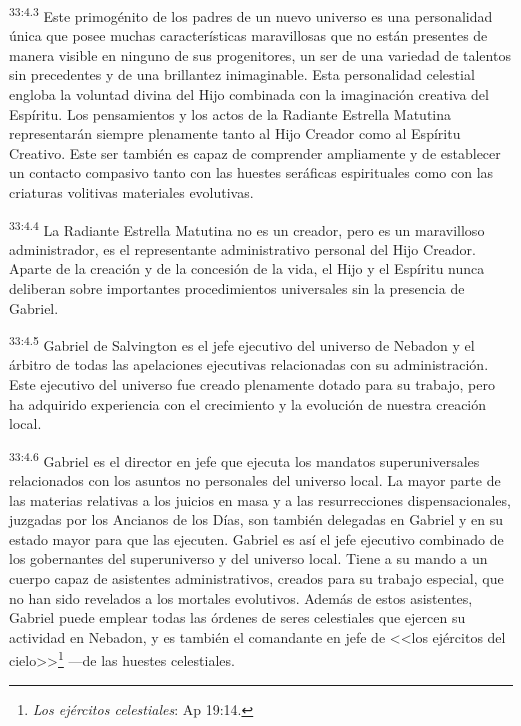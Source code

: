 \par
\textsuperscript{33:4.3} Este primogénito de los padres de un nuevo universo es una personalidad única que posee muchas características maravillosas que no están presentes de manera visible en ninguno de sus progenitores, un ser de una variedad de talentos sin precedentes y de una brillantez inimaginable. Esta personalidad celestial engloba la voluntad divina del Hijo combinada con la imaginación creativa del Espíritu. Los pensamientos y los actos de la Radiante Estrella Matutina representarán siempre plenamente tanto al Hijo Creador como al Espíritu Creativo. Este ser también es capaz de comprender ampliamente y de establecer un contacto compasivo tanto con las huestes seráficas espirituales como con las criaturas volitivas materiales evolutivas.

\par
\textsuperscript{33:4.4} La Radiante Estrella Matutina no es un creador, pero es un maravilloso administrador, es el representante administrativo personal del Hijo Creador. Aparte de la creación y de la concesión de la vida, el Hijo y el Espíritu nunca deliberan sobre importantes procedimientos universales sin la presencia de Gabriel.

\par
\textsuperscript{33:4.5} Gabriel de Salvington es el jefe ejecutivo del universo de Nebadon y el árbitro de todas las apelaciones ejecutivas relacionadas con su administración. Este ejecutivo del universo fue creado plenamente dotado para su trabajo, pero ha adquirido experiencia con el crecimiento y la evolución de nuestra creación local.

\par
\textsuperscript{33:4.6} Gabriel es el director en jefe que ejecuta los mandatos superuniversales relacionados con los asuntos no personales del universo local. La mayor parte de las materias relativas a los juicios en masa y a las resurrecciones dispensacionales, juzgadas por los Ancianos de los Días, son también delegadas en Gabriel y en su estado mayor para que las ejecuten. Gabriel es así el jefe ejecutivo combinado de los gobernantes del superuniverso y del universo local. Tiene a su mando a un cuerpo capaz de asistentes administrativos, creados para su trabajo especial, que no han sido revelados a los mortales evolutivos. Además de estos asistentes, Gabriel puede emplear todas las órdenes de seres celestiales que ejercen su actividad en Nebadon, y es también el comandante en jefe de <<los ejércitos del cielo>>\footnote{\textit{Los ejércitos celestiales}: Ap 19:14.} ---de las huestes celestiales.

